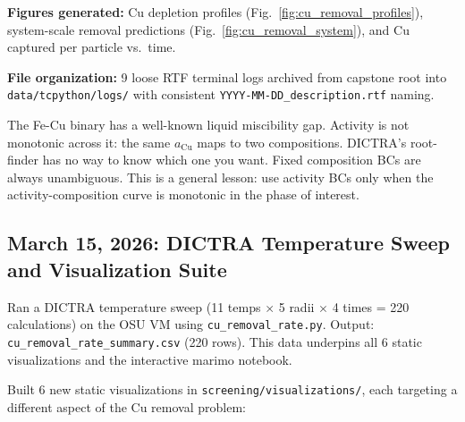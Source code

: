 \documentclass[11pt]{article}
\begin{document}
\textbf{Figures generated:} Cu depletion profiles (Fig.~\ref{fig:cu_removal_profiles}), system-scale removal predictions (Fig.~\ref{fig:cu_removal_system}), and Cu captured per particle vs.\ time.

\textbf{File organization:} 9 loose RTF terminal logs archived from capstone root into \texttt{data/tcpython/logs/} with consistent \texttt{YYYY-MM-DD\_description.rtf} naming.

\begin{insight}
The Fe-Cu binary has a well-known liquid miscibility gap. Activity is not monotonic across it: the same $a_{\text{Cu}}$ maps to two compositions. DICTRA's root-finder has no way to know which one you want. Fixed composition BCs are always unambiguous. This is a general lesson: use activity BCs only when the activity-composition curve is monotonic in the phase of interest.
\end{insight}


\subsection{March 15, 2026: DICTRA Temperature Sweep and Visualization Suite}

Ran a DICTRA temperature sweep (11 temps $\times$ 5 radii $\times$ 4 times = 220 calculations) on the OSU VM using \texttt{cu\_removal\_rate.py}. Output: \texttt{cu\_removal\_rate\_summary.csv} (220 rows). This data underpins all 6 static visualizations and the interactive marimo notebook.

Built 6 new static visualizations in \texttt{screening/visualizations/}, each targeting a different aspect of the Cu removal problem:
\end{document}
